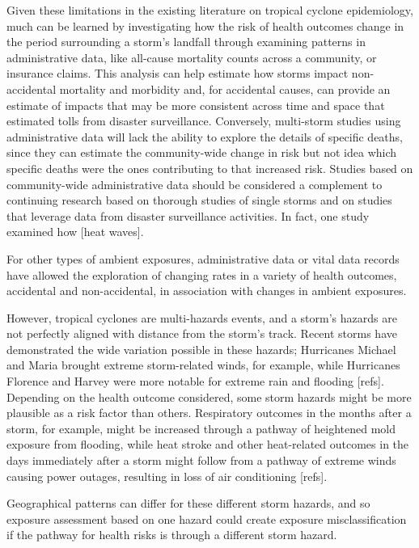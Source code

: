 Given these limitations in the existing literature on tropical cyclone
epidemiology, much can be learned by investigating how the risk of health
outcomes change in the period surrounding a storm's landfall through examining
patterns in administrative data, like all-cause mortality counts across a
community, or insurance claims.  This analysis can help estimate how storms
impact non-accidental mortality and morbidity and, for accidental causes, can
provide an estimate of impacts that may be more consistent across time and
space that estimated tolls from disaster surveillance. Conversely, multi-storm
studies using administrative data will lack the ability to explore the details
of specific deaths, since they can estimate the community-wide change in risk
but not idea which specific deaths were the ones contributing to that increased
risk. Studies based on community-wide administrative data should be considered
a complement to continuing research based on thorough studies of single storms
and on studies that leverage data from disaster surveillance activities. In
fact, one study examined how [heat waves]. 

For other types of ambient exposures, administrative
data or vital data records have allowed the exploration of changing rates in a
variety of health outcomes, accidental and non-accidental, in association with
changes in ambient exposures.

However, tropical cyclones are multi-hazards events, and a storm's hazards are
not perfectly aligned with distance from the storm's track. Recent storms have
demonstrated the wide variation possible in these hazards; Hurricanes
Michael and Maria brought extreme storm-related winds, for
example, while Hurricanes Florence and Harvey were more notable for extreme
rain and flooding [refs]. Depending on the health outcome considered, some
storm hazards might be more plausible as a risk factor than others. Respiratory
outcomes in the months after a storm, for example, might be increased through a
pathway of heightened mold exposure from flooding, while heat stroke and other
heat-related outcomes in the days immediately after a storm might follow from a
pathway of extreme winds causing power outages, resulting in loss of air
conditioning [refs]. 

Geographical patterns can differ for these different
storm hazards, and so exposure assessment based on one hazard could create
exposure misclassification if the pathway for health risks is through a
different storm hazard.   

